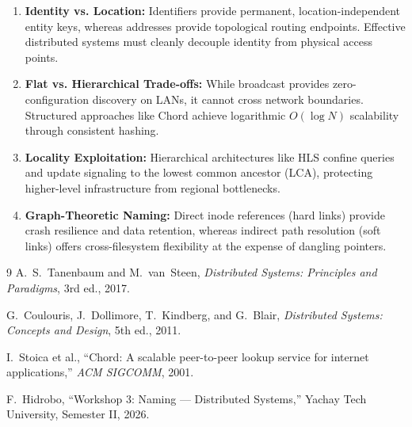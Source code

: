 \documentclass[11pt,a4paper]{article}
\begin{document}
\begin{enumerate}[leftmargin=*,itemsep=1pt]
  \item \textbf{Identity vs. Location:} Identifiers provide permanent, location-independent entity keys, whereas addresses provide topological routing endpoints. Effective distributed systems must cleanly decouple identity from physical access points.
  \item \textbf{Flat vs. Hierarchical Trade-offs:} While broadcast provides zero-configuration discovery on LANs, it cannot cross network boundaries. Structured approaches like Chord achieve logarithmic $O(\log N)$ scalability through consistent hashing.
  \item \textbf{Locality Exploitation:} Hierarchical architectures like HLS confine queries and update signaling to the lowest common ancestor (LCA), protecting higher-level infrastructure from regional bottlenecks.
  \item \textbf{Graph-Theoretic Naming:} Direct inode references (hard links) provide crash resilience and data retention, whereas indirect path resolution (soft links) offers cross-filesystem flexibility at the expense of dangling pointers.
\end{enumerate}

\begin{thebibliography}{9}
\small
{}
A.~S.~Tanenbaum and M.~van~Steen, \textit{Distributed Systems: Principles and Paradigms}, 3rd ed., 2017.

G.~Coulouris, J.~Dollimore, T.~Kindberg, and G.~Blair, \textit{Distributed Systems: Concepts and Design}, 5th ed., 2011.

I.~Stoica et al., ``Chord: A scalable peer-to-peer lookup service for internet applications,'' \textit{ACM SIGCOMM}, 2001.

F.~Hidrobo, ``Workshop 3: Naming --- Distributed Systems,'' Yachay Tech University, Semester II, 2026.
\end{thebibliography}
\end{document}
